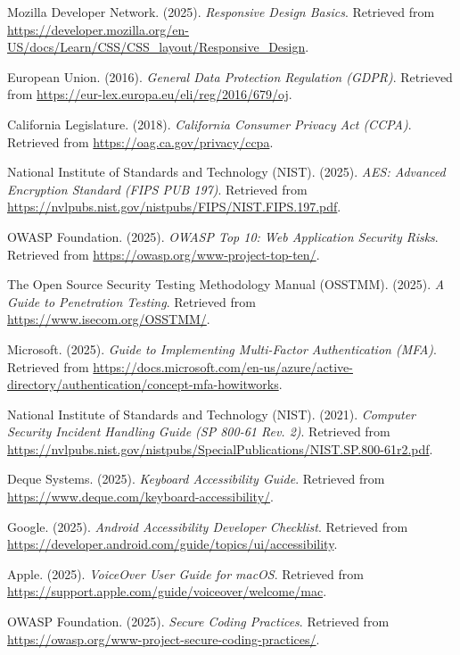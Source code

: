 \begin{thebibliography}{99}
Mozilla Developer Network. (2025). \textit{Responsive Design Basics}. Retrieved from \url{https://developer.mozilla.org/en-US/docs/Learn/CSS/CSS_layout/Responsive_Design}.

European Union. (2016). \textit{General Data Protection Regulation (GDPR)}. Retrieved from \url{https://eur-lex.europa.eu/eli/reg/2016/679/oj}.

California Legislature. (2018). \textit{California Consumer Privacy Act (CCPA)}. Retrieved from \url{https://oag.ca.gov/privacy/ccpa}.

National Institute of Standards and Technology (NIST). (2025). \textit{AES: Advanced Encryption Standard (FIPS PUB 197)}. Retrieved from \url{https://nvlpubs.nist.gov/nistpubs/FIPS/NIST.FIPS.197.pdf}.

OWASP Foundation. (2025). \textit{OWASP Top 10: Web Application Security Risks}. Retrieved from \url{https://owasp.org/www-project-top-ten/}.

The Open Source Security Testing Methodology Manual (OSSTMM). (2025). \textit{A Guide to Penetration Testing}. Retrieved from \url{https://www.isecom.org/OSSTMM/}.

Microsoft. (2025). \textit{Guide to Implementing Multi-Factor Authentication (MFA)}. Retrieved from \url{https://docs.microsoft.com/en-us/azure/active-directory/authentication/concept-mfa-howitworks}.

National Institute of Standards and Technology (NIST). (2021). \textit{Computer Security Incident Handling Guide (SP 800-61 Rev. 2)}. Retrieved from \url{https://nvlpubs.nist.gov/nistpubs/SpecialPublications/NIST.SP.800-61r2.pdf}.

Deque Systems. (2025). \textit{Keyboard Accessibility Guide}. Retrieved from \url{https://www.deque.com/keyboard-accessibility/}.

Google. (2025). \textit{Android Accessibility Developer Checklist}. Retrieved from \url{https://developer.android.com/guide/topics/ui/accessibility}.

Apple. (2025). \textit{VoiceOver User Guide for macOS}. Retrieved from \url{https://support.apple.com/guide/voiceover/welcome/mac}.

OWASP Foundation. (2025). \textit{Secure Coding Practices}. Retrieved from \url{https://owasp.org/www-project-secure-coding-practices/}.


\end{thebibliography}